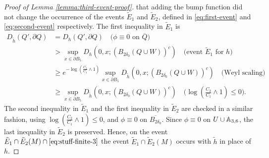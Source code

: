 \documentclass[12pt]{amsart}
\numberwithin{equation}{section}
\begin{document}
\begin{proof}[Proof of Lemma \ref{lemma:third-event-proof}]
		that adding the bump function did not change the occurrence of the events $\tilde E_1$ and $\tilde E_2$,
		defined in \eqref{eq:first-event} and \eqref{eq:second-event} respectively.
		The first inequality in $\tilde E_1$ is 
		\begin{align*}
		D_{\tilde h}(Q', \partial Q) &= D_h(Q', \partial Q) \quad \mbox{($\phi \equiv 0$ on $\overline Q$)} \\
		&> \sup_{x \in \partial B_{5}} D_h(0, x; (B_{2 \delta_0}(Q \cup W))^c) \quad \mbox{(event $\tilde E_1$ for $h$)} \\
		&\geq e^{- \log(\frac{C_2}{C_1} \wedge 1)} \sup_{x \in \partial B_{5}} D_{\tilde h}(0, x; (B_{2 \delta_0}(Q \cup W))^c) \quad \mbox{(Weyl scaling)} \\
		&\geq  \sup_{x \in \partial B_{5}} D_{\tilde h}(0, x; (B_{2 \delta_0}(Q \cup W))^c) \quad \mbox{($\log(\frac{C_2}{C_1} \wedge 1) \leq 0$)}.
		\end{align*}
		The second inequality in $\tilde E_1$ and the first inequality in $\tilde E_2$ are checked in a similar fashion, using 
		$\log(\frac{C_2}{C_1} \wedge 1) \leq 0$, and $\phi \equiv 0$ on $\overline{B_{2 \delta_0}}$.
		Since $\phi \equiv 0$ on $U \cup \mathbb{A}_{3,6}$, the last inequality in $\tilde E_2$ is preserved. 
		Hence, on the event $\tilde E_1 \cap \tilde E_2(M) \cap \eqref{eq:stuff-finite-3}$ the event $\tilde E_1 \cap \tilde E_2(M)$ occurs with $\tilde h$ in place of $h$.
	\end{proof}
	
\end{document}
